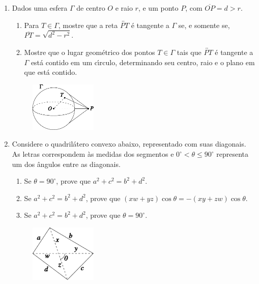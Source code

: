 \documentclass[a4paper,5pt]{amsbook}
\begin{document}
\begin{enumerate}
    \item Dados uma esfera $\Gamma$ de centro $O$ e raio $r$, e um ponto $P$,
        com $\overline{OP} = d>r$.
        \begin{enumerate}
            \vspace{0.3cm}
            \item Para $T\in\Gamma$, mostre que a reta
                $\overleftrightarrow{PT}$ \'e tangente a $\Gamma$ se, e somente
                se, $\overline{PT} = \sqrt{d^2-r^2}$.
            \vspace{0.3cm}
            \item Mostre que o lugar geom\'etrico dos pontos $T\in\Gamma$ tais
                que $\overleftrightarrow{PT}$ \'e tangente a $\Gamma$ est\'a
                contido em um c\'{\i}rculo, determinando seu centro, raio e o plano
                em que est\'a contido.
        \end{enumerate}
        \begin{figure}[!h]
            \centering
            \includegraphics[width=0.3\textwidth]{fig05-3.pdf}
        \end{figure}

    \newpage
    \item Considere o quadril\'atero convexo abaixo, representado com suas
        diagonais. As letras correspondem \`as medidas dos segmentos e $0^\circ <
        \theta \le 90^\circ$ representa um dos \^angulos entre as diagonais.
        \begin{enumerate}
            \vspace{0.3cm}
            \item Se $\theta = 90^\circ$, prove que $a^2+c^2 = b^2+d^2$.
            \vspace{0.3cm}
            \item Se $a^2+c^2 = b^2+d^2$, prove que $(xw+yz)\cos\theta =
                -(xy+zw)\cos\theta$.
            \vspace{0.3cm}
            \item Se $a^2+c^2 = b^2+d^2$, prove que $\theta = 90^\circ$.
        \end{enumerate}
        \begin{figure}[!h]
            \centering
            \includegraphics[width=0.3\textwidth]{fig05-4.pdf}
        \end{figure}


\end{enumerate}
\end{document}
